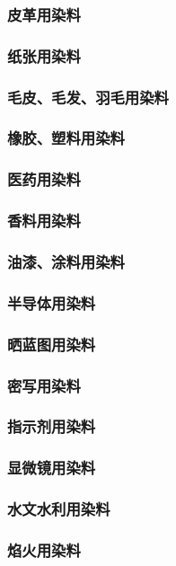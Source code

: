 \documentclass[UTF8]{../../ApplicationUniverse}
\begin{document}
    \subsubsection{皮革用染料}
    \subsubsection{纸张用染料}
    \subsubsection{毛皮、毛发、羽毛用染料}
    \subsubsection{橡胶、塑料用染料}
    \subsubsection{医药用染料}
    \subsubsection{香料用染料}
    \subsubsection{油漆、涂料用染料}
    \subsubsection{半导体用染料}
    \subsubsection{晒蓝图用染料}
    \subsubsection{密写用染料}
    \subsubsection{指示剂用染料}
    \subsubsection{显微镜用染料}
    \subsubsection{水文水利用染料}
    \subsubsection{焰火用染料}
\end{document}
